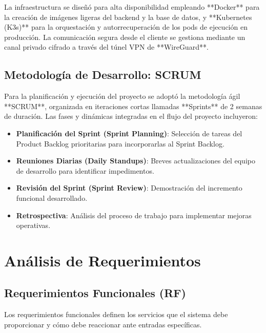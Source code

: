 \documentclass[12pt,a4paper]{report}
\begin{document}
La infraestructura se diseñó para alta disponibilidad empleando **Docker** para la creación de imágenes ligeras del backend y la base de datos, y **Kubernetes (K3s)** para la orquestación y autorrecuperación de los pods de ejecución en producción. La comunicación segura desde el cliente se gestiona mediante un canal privado cifrado a través del túnel VPN de **WireGuard**.

\section{Metodología de Desarrollo: SCRUM}
Para la planificación y ejecución del proyecto se adoptó la metodología ágil **SCRUM**, organizada en iteraciones cortas llamadas **Sprints** de 2 semanas de duración. Las fases y dinámicas integradas en el flujo del proyecto incluyeron:
\begin{itemize}
    \item \textbf{Planificación del Sprint (Sprint Planning)}: Selección de tareas del Product Backlog prioritarias para incorporarlas al Sprint Backlog.
    \item \textbf{Reuniones Diarias (Daily Standups)}: Breves actualizaciones del equipo de desarrollo para identificar impedimentos.
    \item \textbf{Revisión del Sprint (Sprint Review)}: Demostración del incremento funcional desarrollado.
    \item \textbf{Retrospectiva}: Análisis del proceso de trabajo para implementar mejoras operativas.
\end{itemize}

\newpage

\chapter{Análisis de Requerimientos}

\section{Requerimientos Funcionales (RF)}
Los requerimientos funcionales definen los servicios que el sistema debe proporcionar y cómo debe reaccionar ante entradas específicas.
\end{document}
